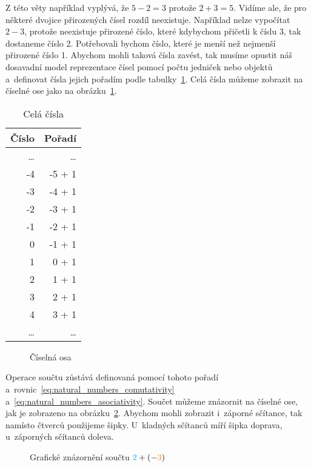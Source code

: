 Z této věty například vyplývá, že \(5 - 2 = 3\) protože \(2 + 3 = 5\). Vidíme ale, že pro některé dvojice přirozených čísel rozdíl neexistuje. Například nelze vypočítat \(2 - 3\), protože neexistuje přirozené číslo, které kdybychom přičetli k číslu 3, tak dostaneme číslo 2. Potřebovali bychom číslo, které je menší než nejmenší přirozené číslo 1. Abychom mohli taková čísla zavést, tak musíme opustit náš dosavadní model reprezentace čísel pomocí počtu jedniček nebo objektů a~definovat čísla jejich pořadím podle tabulky~\ref{tab:integers}. Celá čísla můžeme zobrazit na číselné ose jako na obrázku~\ref{img:integer_number_line}.

\begin{table}[ht]
\centering
\begin{tabular}{|r|r|}
\hline
Číslo & Pořadí \\
\hline
\ldots & \ldots \\
-4 & -5 + 1 \\
-3 & -4 + 1 \\
-2 & -3 + 1 \\
-1 & -2 + 1 \\
0 & -1 + 1 \\
1 & 0 + 1 \\
2 & 1 + 1 \\
3 & 2 + 1 \\
4 & 3 + 1 \\
\ldots & \ldots \\
\hline
\end{tabular}
\caption{Celá čísla}
\label{tab:integers}
\end{table}

\begin{figure}[!h]
\centering
{}
\caption{Číselná osa}
\label{img:integer_number_line}
\end{figure}

Operace součtu zůstává definovaná pomocí tohoto pořadí a~rovnic~\eqref{eq:natural_numbers_comutativity} a~\eqref{eq:natural_numbers_asociativity}. Součet můžeme znázornit na číselné ose, jak je zobrazeno na obrázku~\ref{img:integer_add}. Abychom mohli zobrazit i~záporné sčítance, tak namísto čtverců použijeme šipky. U~kladných sčítanců míří šipka doprava, u~záporných sčítanců doleva.

\begin{figure}[!h]
\centering
{}
\caption{Grafické znázornění součtu \(\textcolor{cyan}{2} + (-\textcolor{orange}{3})\)}
\label{img:integer_add}
\end{figure}

